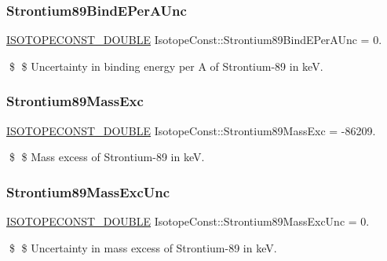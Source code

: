 \subsubsection{\texorpdfstring{Strontium89\+Bind\+E\+Per\+A\+Unc}{Strontium89BindEPerAUnc}}
{\footnotesize\ttfamily \mbox{\hyperlink{group___isotope_const-_macros_ga8f45a7272ce02c0b4c65c44636ed719a}{I\+S\+O\+T\+O\+P\+E\+C\+O\+N\+S\+T\+\_\+\+D\+O\+U\+B\+LE}} Isotope\+Const\+::\+Strontium89\+Bind\+E\+Per\+A\+Unc = 0.}

\$ \$ Uncertainty in binding energy per A of Strontium-\/89 in keV. \mbox{\label{group___isotope_const-_strontium-_sr89_ga2b0bfb0727eb359f05b389a592bd5da4}} 
\subsubsection{\texorpdfstring{Strontium89\+Mass\+Exc}{Strontium89MassExc}}
{\footnotesize\ttfamily \mbox{\hyperlink{group___isotope_const-_macros_ga8f45a7272ce02c0b4c65c44636ed719a}{I\+S\+O\+T\+O\+P\+E\+C\+O\+N\+S\+T\+\_\+\+D\+O\+U\+B\+LE}} Isotope\+Const\+::\+Strontium89\+Mass\+Exc = -\/86209.}

\$ \$ Mass excess of Strontium-\/89 in keV. \mbox{\label{group___isotope_const-_strontium-_sr89_ga6c660c9a7d04266d3617e4c5a599fa8d}} 
\subsubsection{\texorpdfstring{Strontium89\+Mass\+Exc\+Unc}{Strontium89MassExcUnc}}
{\footnotesize\ttfamily \mbox{\hyperlink{group___isotope_const-_macros_ga8f45a7272ce02c0b4c65c44636ed719a}{I\+S\+O\+T\+O\+P\+E\+C\+O\+N\+S\+T\+\_\+\+D\+O\+U\+B\+LE}} Isotope\+Const\+::\+Strontium89\+Mass\+Exc\+Unc = 0.}

\$ \$ Uncertainty in mass excess of Strontium-\/89 in keV. \mbox{\label{group___isotope_const-_strontium-_sr89_ga89b0008dddd2cd5f68be7e2d251ea166}} 
